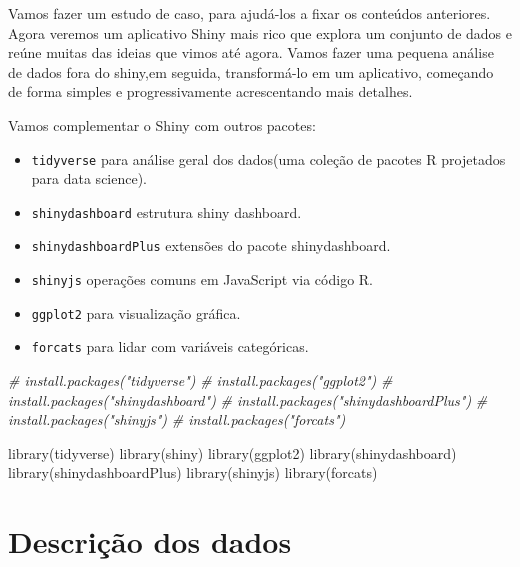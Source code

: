 \documentclass[
]{book}
\newenvironment{Shaded}{\begin{snugshade}}{\end{snugshade}}
\newcommand{\CommentTok}[1]{\textcolor[rgb]{0.56,0.35,0.01}{\textit{#1}}}
\newcommand{\FunctionTok}[1]{\textcolor[rgb]{0.00,0.00,0.00}{#1}}
\newcommand{\NormalTok}[1]{#1}
\providecommand{\tightlist}{%
  \setlength{\itemsep}{0pt}\setlength{\parskip}{0pt}}
\begin{document}
Vamos fazer um estudo de caso, para ajudá-los a fixar os conteúdos anteriores. Agora veremos um aplicativo Shiny mais rico que explora um conjunto de dados e reúne muitas das ideias que vimos até agora. Vamos fazer uma pequena análise de dados fora do shiny,em seguida, transformá-lo em um aplicativo, começando de forma simples e progressivamente acrescentando mais detalhes.

Vamos complementar o Shiny com outros pacotes:

\begin{itemize}
\tightlist
\item
  \texttt{tidyverse} para análise geral dos dados(uma coleção de pacotes R projetados para data science).
\item
  \texttt{shinydashboard} estrutura shiny dashboard.
\item
  \texttt{shinydashboardPlus} extensões do pacote shinydashboard.
\item
  \texttt{shinyjs} operações comuns em JavaScript via código R.
\item
  \texttt{ggplot2} para visualização gráfica.
\item
  \texttt{forcats} para lidar com variáveis categóricas.
\end{itemize}

\begin{Shaded}
\begin{Highlighting}[]
\CommentTok{\# install.packages("tidyverse")}
\CommentTok{\# install.packages("ggplot2")}
\CommentTok{\# install.packages("shinydashboard")}
\CommentTok{\# install.packages("shinydashboardPlus")}
\CommentTok{\# install.packages("shinyjs")}
\CommentTok{\# install.packages("forcats")}

\FunctionTok{library}\NormalTok{(tidyverse)}
\FunctionTok{library}\NormalTok{(shiny)}
\FunctionTok{library}\NormalTok{(ggplot2)}
\FunctionTok{library}\NormalTok{(shinydashboard)}
\FunctionTok{library}\NormalTok{(shinydashboardPlus)}
\FunctionTok{library}\NormalTok{(shinyjs)}
\FunctionTok{library}\NormalTok{(forcats)}
\end{Highlighting}
\end{Shaded}

\hypertarget{descriuxe7uxe3o-dos-dados}{%
\section{\texorpdfstring{\textbf{Descrição dos dados}}{Descrição dos dados}}\label{descriuxe7uxe3o-dos-dados}}
\end{document}
